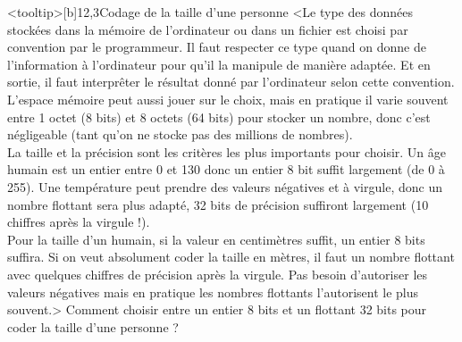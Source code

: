 \begin{quiz}[title={Organisation des données}]
\vspace{-.5\baselineskip}
\begin{quizquestion*}<tooltip>[b]{1}{2,3}{Codage de la taille d'une personne}
<Le type des données stockées dans la mémoire de l'ordinateur ou dans un fichier est choisi par convention par le programmeur. Il faut respecter ce type quand on donne de l'information à l'ordinateur pour qu'il la manipule de manière adaptée. Et en sortie, il faut interprêter le résultat donné par l'ordinateur selon cette convention.\\
L'espace mémoire peut aussi jouer sur le choix, mais en pratique il varie souvent entre 1 octet (8 bits) et 8 octets (64 bits) pour stocker un nombre, donc c'est négligeable (tant qu'on ne stocke pas des millions de nombres).\\
La taille et la précision sont les critères les plus importants pour choisir. Un âge humain est un entier entre 0 et 130 donc un entier 8 bit suffit largement (de 0 à 255). Une température peut prendre des valeurs négatives et à virgule, donc un nombre flottant sera plus adapté, 32 bits de précision suffiront largement (10 chiffres après la virgule !).\\
Pour la taille d'un humain, si la valeur en centimètres suffit, un entier 8 bits suffira. Si on veut absolument coder la taille en mètres, il faut un nombre flottant avec quelques chiffres de précision après la virgule. Pas besoin d'autoriser les valeurs négatives mais en pratique les nombres flottants l'autorisent le plus souvent.>
Comment choisir entre un entier 8 bits et un flottant 32 bits pour coder la taille d'une personne ?
\end{quizquestion*}


\end{quiz}
